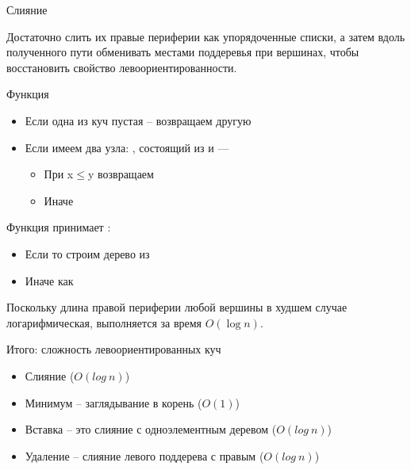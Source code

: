 \begin{frame}[fragile]{Слияние}
\begin{idea}
Достаточно слить их правые периферии как
упорядоченные списки, а затем вдоль полученного пути обменивать
местами поддеревья при вершинах, чтобы восстановить свойство
левоориентированности.
\end{idea}

Функция  
\begin{itemize}
\item Если одна из куч пустая -- возвращаем другую
\item Если имеем два узла: , состоящий из  и   ---  
\begin{itemize}
\item При x$\leqslant$y возвращаем 
\item Иначе 
\end{itemize}
\end{itemize}

Функция  принимает :
\begin{itemize}
\item Если  то строим дерево из 
\item Иначе как 
\end{itemize}


Поскольку длина правой периферии любой вершины в худшем случае
логарифмическая,  выполняется за время $O(\log n)$.
\end{frame}

\def\Olog{\ensuremath{O(log\ n)}}
\begin{frame}[fragile]{Итого: сложность левоориентированных куч }

\begin{itemize}
\item Слияние  (\Olog)
\item Минимум -- заглядывание в корень ($O(1)$)
\item Вставка -- это слияние с одноэлементным деревом (\Olog)
\item Удаление -- слияние левого поддерева с правым (\Olog)
\end{itemize}
%
\end{frame}

